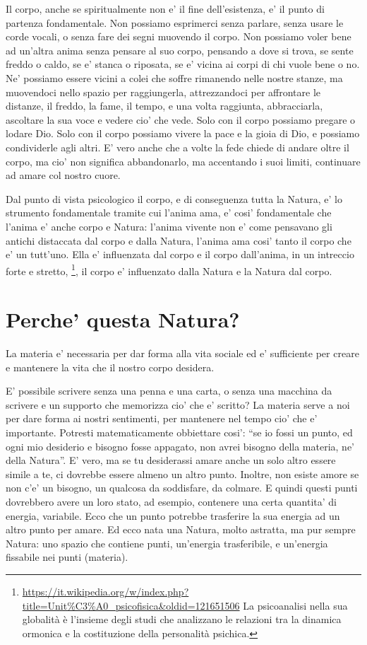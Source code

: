 Il corpo, anche se spiritualmente non e' il fine dell'esistenza, e' il punto di partenza fondamentale. Non possiamo esprimerci senza parlare, senza usare le corde vocali, o senza fare dei segni muovendo il corpo. Non possiamo voler bene ad un'altra anima senza pensare al suo corpo, pensando a dove si trova, se sente freddo o caldo, se e' stanca o riposata, se e' vicina ai corpi di chi vuole bene o no. Ne' possiamo essere vicini a colei che soffre rimanendo nelle nostre stanze, ma muovendoci nello spazio per raggiungerla, attrezzandoci per affrontare le distanze, il freddo, la fame, il tempo, e una volta raggiunta, abbracciarla, ascoltare la sua voce e vedere cio' che vede.
Solo con il corpo possiamo pregare o lodare Dio. Solo con il corpo possiamo vivere la pace e la gioia di Dio, e possiamo condividerle agli altri. E' vero anche che a volte la fede chiede di andare oltre il corpo, ma cio' non significa abbandonarlo, ma accentando i suoi limiti, continuare ad amare col nostro cuore.

Dal punto di vista psicologico il corpo, e di conseguenza tutta la Natura, e' lo strumento fondamentale tramite cui l'anima ama, e' cosi' fondamentale che l'anima e' anche corpo e Natura: l'anima vivente non e' come pensavano gli antichi distaccata dal corpo e dalla Natura, l'anima ama cosi' tanto il corpo che e' un tutt'uno. Ella e' influenzata dal corpo e il corpo dall'anima, in un intreccio forte e stretto, \footnote{
    \url{https://it.wikipedia.org/w/index.php?title=Unit\%C3\%A0\_psicofisica&oldid=121651506}
    La psicoanalisi nella sua globalità è l'insieme degli studi che analizzano le relazioni tra la dinamica ormonica e la costituzione della personalità psichica. 
}, il corpo e' influenzato dalla Natura e la Natura dal corpo.


\section{Perche' questa Natura?}
\label{PercheQuestaNatura}
La materia e' necessaria per dar forma alla vita sociale ed e' sufficiente per creare e mantenere la vita che il nostro corpo desidera.

E' possibile scrivere senza una penna e una carta, o senza una macchina da scrivere e un supporto che memorizza cio' che e' scritto? 
La materia serve a noi per dare forma ai nostri sentimenti, per mantenere nel tempo cio' che e' importante. Potresti matematicamente obbiettare cosi': ``se io fossi un punto, ed ogni mio desiderio e bisogno fosse appagato, non avrei bisogno della materia, ne' della Natura''. E' vero, ma se tu desiderassi amare anche un solo altro essere simile a te, ci dovrebbe essere almeno un altro punto. Inoltre, non esiste amore se non c'e' un bisogno, un qualcosa da soddisfare, da colmare. E quindi questi punti dovrebbero avere un loro stato, ad esempio, contenere una certa quantita' di energia, variabile. Ecco che un punto potrebbe trasferire la sua energia ad un altro punto per amare. Ed ecco nata una Natura, molto astratta, ma pur sempre Natura: uno spazio che contiene punti, un'energia trasferibile, e un'energia fissabile nei punti (materia).

